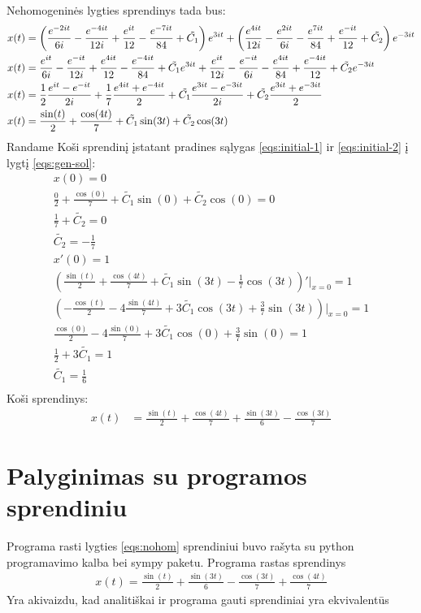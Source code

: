 \documentclass[11pt]{article}
\begin{document}
Nehomogeninės lygties sprendinys tada bus:
\begin{align}
x(t)&=\left(\frac{e^{-2it}}{6i}-\frac{e^{-4it}}{12i}+\frac{e^{it}}{12}-\frac{e^{-7it}}{84}+\tilde{C_1}\right)e^{3it}
+\left(\frac{e^{4it}}{12i}-\frac{e^{2it}}{6i}-\frac{e^{7it}}{84}+\frac{e^{-it}}{12}+\tilde{C_2}\right)e^{-3it}\notag\\
x(t)&=\frac{e^{it}}{6i}-\frac{e^{-it}}{12i}+\frac{e^{4it}}{12}-\frac{e^{-4it}}{84}+\tilde{C_1}e^{3it}
+\frac{e^{it}}{12i}-\frac{e^{-it}}{6i}-\frac{e^{4it}}{84}+\frac{e^{-4it}}{12}+\tilde{C_2}e^{-3it}\notag\\
x(t)&=\frac{1}{2}\frac{e^{it}-e^{-it}}{2i}+\frac{1}{7}\frac{e^{4it}+e^{-4it}}{2}+\tilde{C_1}\frac{e^{3it}-e^{-3it}}{2i}+\tilde{C_2}\frac{e^{3it}+e^{-3it}}{2}\notag\\
x(t)&=\frac{\sin(t)}{2}+\frac{\cos(4t)}{7}+\tilde{C_1}\sin(3t)+\tilde{C_2}\cos(3t)\label{eqs:gen-sol}
\end{align}
Randame Koši sprendinį įstatant pradines sąlygas \eqref{eqs:initial-1} ir \eqref{eqs:initial-2} į lygtį \eqref{eqs:gen-sol}:
\begin{align*}
x(0)=0\\
\frac{0}{2}+\frac{\cos(0)}{7}+\tilde{C_1}\sin(0)+\tilde{C_2}\cos(0)=0\\
\frac{1}{7}+\tilde{C_2}=0\\
\tilde{C_2}=-\frac{1}{7}\\
x'(0)=1\\
\left(\frac{\sin(t)}{2}+\frac{\cos(4t)}{7}+\tilde{C_1}\sin(3t)-\frac{1}{7}\cos(3t)\right)'\Big\vert_{x=0}=1\\
\left(-\frac{\cos(t)}{2}-4\frac{\sin(4t)}{7}+3\tilde{C_1}\cos(3t)+\frac{3}{7}\sin(3t)\right)\Big\vert_{x=0}=1\\
\frac{\cos(0)}{2}-4\frac{\sin(0)}{7}+3\tilde{C_1}\cos(0)+\frac{3}{7}\sin(0)=1\\
\frac{1}{2}+3\tilde{C_1}=1\\
\tilde{C_1}=\frac{1}{6}\\
\end{align*}
Koši sprendinys:
\begin{align}
x(t)&=\frac{\sin(t)}{2}+\frac{\cos(4t)}{7}+\frac{\sin(3t)}{6}-\frac{\cos(3t)}{7}\label{eqs:cauchy-sol}
\end{align}
\section{Palyginimas su programos sprendiniu}
Programa rasti lygties \eqref{eqs:nohom} sprendiniui buvo rašyta su python programavimo
kalba bei sympy paketu. Programa rastas sprendinys
\begin{align}
x(t)=\frac{\sin(t)}{2}+\frac{\sin(3t)}{6}-\frac{\cos(3t)}{7}+\frac{\cos(4t)}{7}
\end{align}
Yra akivaizdu, kad analitiškai ir programa gauti sprendiniai yra ekvivalentūs
\newpage
\end{document}
